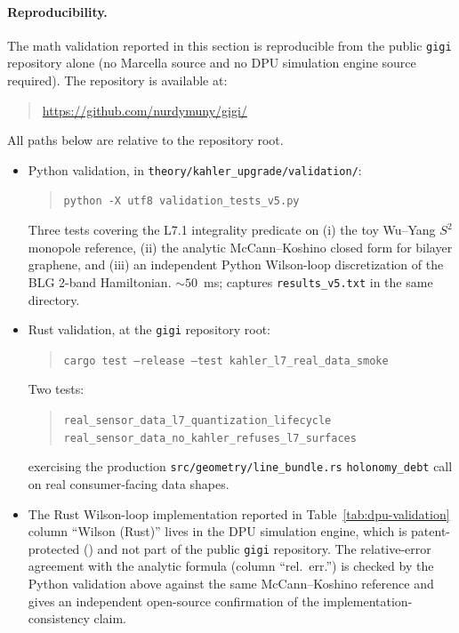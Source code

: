 \documentclass[11pt,letterpaper]{article}
\begin{document}
\paragraph{Reproducibility.}
The math validation reported in this section is reproducible from
the public \texttt{gigi} repository alone (no Marcella source and
no DPU simulation engine source required). The repository is
available at:
\begin{quote}
\url{https://github.com/nurdymuny/gigi/}
\end{quote}
All paths below are relative to the repository root.
\begin{itemize}[nosep]
\item Python validation, in
\texttt{theory/kahler\_upgrade/validation/}:
\begin{quote}
\sloppy
\texttt{python -X utf8 validation\_tests\_v5.py}
\end{quote}
Three tests covering the L7.1 integrality predicate on
(i) the toy Wu--Yang $S^2$ monopole reference, (ii) the analytic
McCann--Koshino closed form for bilayer graphene, and
(iii) an independent Python Wilson-loop discretization of the BLG
2-band Hamiltonian. $\sim 50$~ms; captures
\texttt{results\_v5.txt} in the same directory.
\item Rust validation, at the \texttt{gigi} repository root:
\begin{quote}
\sloppy
\texttt{cargo test --release --test
kahler\_l7\_real\_data\_smoke}
\end{quote}
Two tests:
\begin{quote}
\sloppy
\texttt{real\_sensor\_data\_l7\_quantization\_lifecycle} \\
\texttt{real\_sensor\_data\_no\_kahler\_refuses\_l7\_surfaces}
\end{quote}
exercising the production \texttt{src/geometry/line\_bundle.rs}
\texttt{holonomy\_debt} call on real consumer-facing data shapes.
\item The Rust Wilson-loop implementation reported in
Table~\ref{tab:dpu-validation} column ``Wilson (Rust)'' lives in
the DPU simulation engine, which is patent-protected
(\cite{davis2026dpu}) and not part of the public \texttt{gigi}
repository. The relative-error agreement with the analytic
formula (column ``rel.\ err.'') is checked by the Python
validation above against the same McCann--Koshino reference and
gives an independent open-source confirmation of the
implementation-consistency claim.
\end{itemize}
\end{document}
